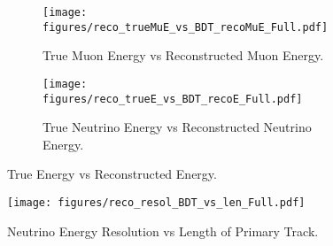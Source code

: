 \begin{figure}[!th]
\centering
\begin{subfigure}[t]{0.95\textwidth}
  \centering
  \texttt{[image: figures/reco\_trueMuE\_vs\_BDT\_recoMuE\_Full.pdf]}
  \caption{True Muon Energy vs Reconstructed Muon Energy.}
  \label{fig:trueMuE_vs_recoMuE}
\end{subfigure}
\vspace{0.5cm}
\newline
\begin{subfigure}[t]{0.95\textwidth}
  \centering
  \texttt{[image: figures/reco\_trueE\_vs\_BDT\_recoE\_Full.pdf]}
  \caption{True Neutrino Energy vs Reconstructed Neutrino Energy.}
  \label{fig:trueE_vs_recoE}
\end{subfigure}
\caption{ True Energy vs Reconstructed Energy.}
\label{fig:true_vs_reco}
\end{figure}

\begin{figure}[!th]
\centering
\texttt{[image: figures/reco\_resol\_BDT\_vs\_len\_Full.pdf]}
\caption{Neutrino Energy Resolution vs Length of Primary Track.}
\label{fig:resol_vs_len}
\end{figure}

